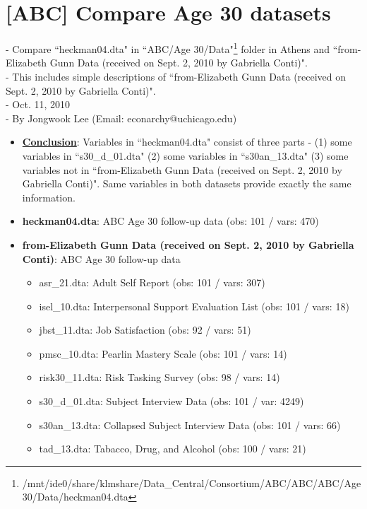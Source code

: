 \documentclass[11pt]{article}
\begin{document}
\section*{[ABC] Compare Age 30 datasets}
\noindent - Compare ``heckman04.dta" in ``ABC/Age 30/Data"\footnote{/mnt/ide0/share/klmshare/Data\_Central/Consortium/ABC/ABC/ABC/Age 30/Data/heckman04.dta} folder in Athens and ``from-Elizabeth Gunn Data (received on Sept. 2, 2010 by Gabriella Conti)".\\
- This includes simple descriptions of ``from-Elizabeth Gunn Data (received on Sept. 2, 2010 by Gabriella Conti)".\\
- Oct. 11, 2010\\
- By Jongwook Lee (Email: econarchy@uchicago.edu)\\

\begin{itemize}
    \item {\bf \underline {Conclusion}}: Variables in ``heckman04.dta" consist of three parts - (1) some variables in ``s30\_d\_01.dta" (2) some variables in ``s30an\_13.dta" (3) some variables not in ``from-Elizabeth Gunn Data (received on Sept. 2, 2010 by Gabriella Conti)". Same variables in both datasets provide exactly the same information.\\
    \item {\bf heckman04.dta}: ABC Age 30 follow-up data (obs: 101 / vars: 470)
    \item {\bf from-Elizabeth Gunn Data (received on Sept. 2, 2010 by Gabriella Conti)}: ABC Age 30 follow-up data
    \begin{itemize}
        \item asr\_21.dta: Adult Self Report (obs: 101 / vars: 307)
        \item isel\_10.dta: Interpersonal Support Evaluation List (obs: 101 / vars: 18)
        \item jbst\_11.dta: Job Satisfaction (obs: 92 / vars: 51)
        \item pmsc\_10.dta: Pearlin Mastery Scale (obs: 101 / vars: 14)
        \item risk30\_11.dta: Risk Tasking Survey (obs: 98 / vars: 14)
        \item s30\_d\_01.dta: Subject Interview Data (obs: 101 / var: 4249)
        \item s30an\_13.dta: Collapsed Subject Interview Data (obs: 101 / vars: 66)
        \item tad\_13.dta: Tabacco, Drug, and Alcohol (obs: 100 / vars: 21)\\
    \end{itemize}
\end{itemize}
\end{document}
